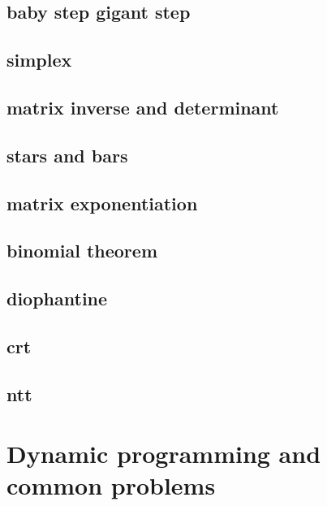 \subsection{baby step gigant step}
\raggedbottom
\hrulefill
\subsection{simplex}
\raggedbottom
\hrulefill
\subsection{matrix inverse and determinant}
\raggedbottom
\hrulefill
\subsection{stars and bars}
\raggedbottom
\hrulefill
\subsection{matrix exponentiation}
\raggedbottom
\hrulefill
\subsection{binomial theorem}
\raggedbottom
\hrulefill
\subsection{diophantine}
\raggedbottom
\hrulefill
\subsection{crt}
\raggedbottom
\hrulefill
\subsection{ntt}
\raggedbottom
\hrulefill

\section{Dynamic programming and common problems}
